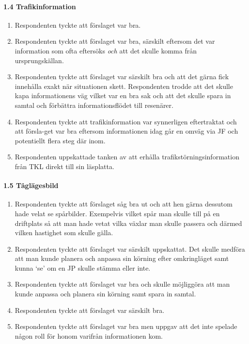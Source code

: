 \paragraph{1.4 Trafikinformation}
\begin{enumerate}
    \item Respondenten tyckte att förslaget var bra.
    \item Respondenten tyckte att förslaget var bra, särskilt eftersom det var information som ofta eftersöks \emph{och} att det skulle komma från ursprungskällan.
    \item Respondenten tyckte att förslaget var särskilt bra och att det gärna fick innehålla exakt när situationen skett.
    Respondenten trodde att det skulle kapa informationens väg vilket var en bra sak och att det skulle spara in samtal och förbättra informationsflödet till resenärer.
    \item Respondenten tyckte att trafikinformation var synnerligen eftertraktat och att försla-get var bra eftersom informationen idag går en omväg via JF och potentiellt flera steg där inom.
    \item Respondenten uppskattade tanken av att erhålla trafikstörningsinformation från TKL direkt till sin läsplatta.
\end{enumerate}
\hspace{-12pt}
\paragraph{1.5 Tåglägesbild}
\begin{enumerate}
    \item Respondenten tyckte att förslaget såg bra ut och att hen gärna dessutom hade velat se spårbilder.
    Exempelvis vilket spår man skulle till på en driftplats så att man hade vetat vilka växlar man skulle passera och därmed vilken hastighet som skulle gälla.
    \item Respondenten tyckte att förslaget var särskilt uppskattat.
    Det skulle medföra att man kunde planera och anpassa sin körning efter omkringläget samt kunna \lq{}se\rq{} om en JP skulle stämma eller inte.
    \item Respondenten tyckte att förslaget var bra och skulle möjliggöra att man kunde anpassa och planera sin körning samt spara in samtal.
    \item Respondenten tyckte att förslaget var särskilt bra.
    \item Respondenten tyckte att förslaget var bra men uppgav att det inte spelade någon roll för honom varifrån informationen kom.
\end{enumerate}
\hspace{-12pt}
